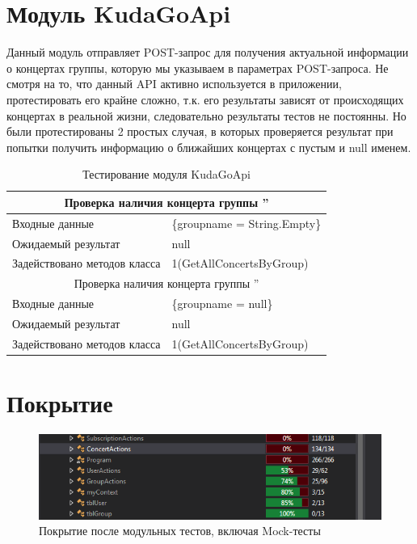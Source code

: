\newpage
\section{Модуль KudaGoApi}

Данный модуль отправляет POST-запрос для получения актуальной информации о концертах группы, которую мы указываем в параметрах POST-запроса.
Не смотря на то, что данный API активно используется в приложении, протестировать его крайне сложно, т.к. его результаты зависят от происходящих концертах в реальной жизни, следовательно результаты тестов не постоянны. Но были протестированы 2 простых случая, в которых проверяется результат при попытки получить информацию о ближайших концертах с пустым и null именем. 
\begin{table} 
	\caption{\label{tab:maintable}Тестирование модуля KudaGoApi}
		\begin{tabular}{|l|p{10cm}|}
\hline
\multicolumn{2}{|c|}{Проверка наличия концерта группы ''} \\
\hline
Входные данные & \{groupname = String.Empty\} \\
Ожидаемый результат &   null \\
Задействовано методов класса & 1(GetAllConcertsByGroup)\\
\hline
\multicolumn{2}{|c|}{Проверка наличия концерта группы ''} \\
\hline
Входные данные & \{groupname = null\} \\
Ожидаемый результат &   null \\
Задействовано методов класса & 1(GetAllConcertsByGroup)\\
\hline
		\end{tabular}
\end{table} 

\section{Покрытие}
\begin{figure}
	\centering
	\includegraphics[scale=1]{CoverUnit.PNG}
	\caption{Покрытие после модульных тестов, включая Mock-тесты }
	\label{image:cover-unit}
\end{figure}
